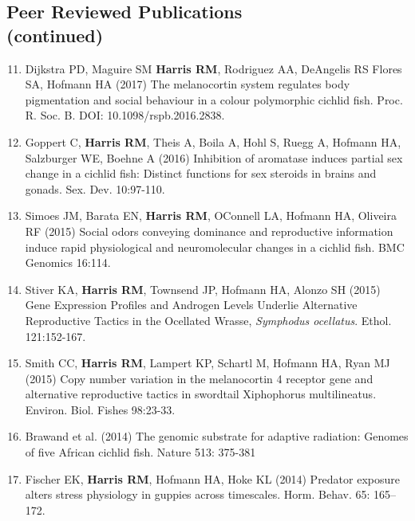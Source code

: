 \documentclass[margin,line]{CV}
\newenvironment{benumerate}[1]{
    \let\oldItem\item
    \def\item{\addtocounter{enumi}{-2}\oldItem}
    \begin{enumerate}
    \setcounter{enumi}{#1}
    \addtocounter{enumi}{1}
}{
    \end{enumerate}
}
\begin{document}
\begin{resume}
\section{\mysidestyle Peer Reviewed Publications\\ (continued)}
    
\begin{benumerate}{10}
\setlength{\itemsep}{1pt}

\item Dijkstra PD, Maguire SM {\bf Harris RM}, Rodriguez AA, DeAngelis RS Flores SA, Hofmann HA (2017) The melanocortin system regulates body pigmentation and social behaviour in a colour polymorphic cichlid fish. Proc. R. Soc. B. DOI: 10.1098/rspb.2016.2838.


\item Goppert C, {\bf Harris RM}, Theis A, Boila A, Hohl S, Ruegg A, Hofmann HA, Salzburger WE, Boehne A (2016) Inhibition of aromatase induces partial sex change in a cichlid fish: Distinct functions for sex steroids in brains and gonads. Sex. Dev. 10:97-110.

\item Simoes JM, Barata EN, {\bf Harris RM}, O\textsc{}Connell LA, Hofmann HA, Oliveira RF (2015) Social odors conveying dominance and reproductive information induce rapid physiological and neuromolecular changes in a cichlid fish. BMC Genomics 16:114. 

\item Stiver KA, {\bf Harris RM}, Townsend JP, Hofmann HA, Alonzo SH (2015) Gene Expression Profiles and Androgen Levels Underlie Alternative Reproductive Tactics in the Ocellated Wrasse, {\it Symphodus ocellatus}. Ethol. 121:152-167.

\item Smith CC, {\bf Harris RM}, Lampert KP, Schartl M, Hofmann HA, Ryan MJ (2015) Copy number variation in the melanocortin 4 receptor gene and alternative reproductive tactics in swordtail Xiphophorus multilineatus. Environ. Biol. Fishes 98:23-33.

\item Brawand et al. (2014) The genomic substrate for adaptive radiation: Genomes of five African cichlid fish. Nature 513: 375-381

\item Fischer EK, {\bf Harris RM}, Hofmann HA, Hoke KL (2014) Predator exposure alters stress physiology in guppies across timescales. Horm. Behav. 65: 165–172. 


\end{benumerate}
\end{resume}
\end{document}
